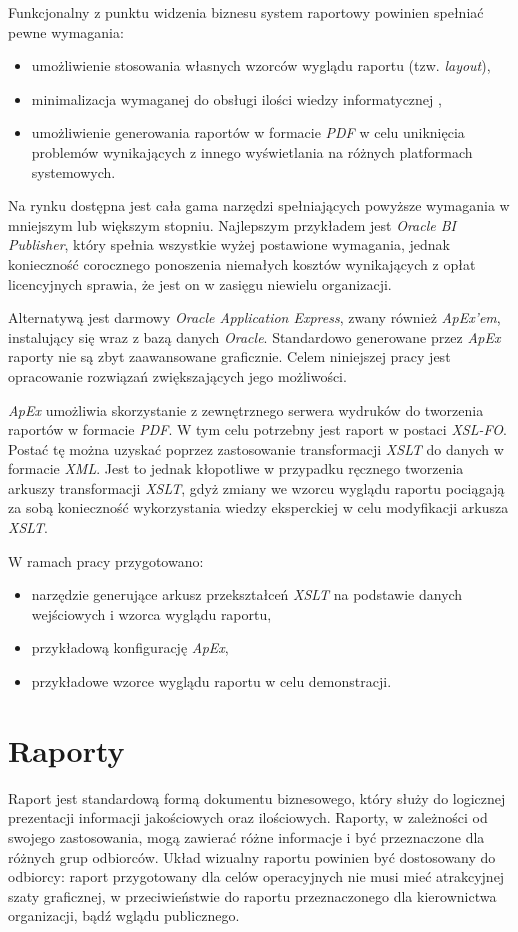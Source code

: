 \documentclass[11pt,a4paper]{article}
\begin{document}
Funkcjonalny z punktu widzenia biznesu system raportowy powinien spełniać pewne wymagania:
\begin{itemize}
	\item umożliwienie stosowania własnych wzorców wyglądu raportu (tzw. \emph{layout}),
	\item minimalizacja wymaganej do obsługi ilości wiedzy informatycznej ,
	\item umożliwienie generowania raportów w formacie \emph{PDF} w celu uniknięcia problemów wynikających z innego wyświetlania na różnych platformach systemowych.
\end{itemize}

Na rynku dostępna jest cała gama narzędzi spełniających powyższe wymagania w mniejszym lub większym stopniu. Najlepszym przykładem jest \emph{Oracle BI Publisher}, który spełnia wszystkie wyżej postawione wymagania, jednak konieczność corocznego ponoszenia niemałych kosztów wynikających z opłat licencyjnych sprawia, że jest on w zasięgu niewielu organizacji.

Alternatywą jest darmowy \emph{Oracle Application Express}, zwany również \emph{ApEx'em}, instalujący się wraz z bazą danych \emph{Oracle}. Standardowo generowane przez \emph{ApEx} raporty nie są zbyt zaawansowane graficznie. Celem niniejszej pracy jest opracowanie rozwiązań zwiększających jego możliwości.

\emph{ApEx} umożliwia skorzystanie z zewnętrznego serwera wydruków do tworzenia raportów w formacie \emph{PDF}. W tym celu potrzebny jest raport w postaci \emph{XSL-FO}. Postać tę można uzyskać poprzez zastosowanie transformacji \emph{XSLT} do danych w formacie \emph{XML}. Jest to jednak kłopotliwe w przypadku ręcznego tworzenia arkuszy transformacji \emph{XSLT}, gdyż zmiany we wzorcu wyglądu raportu pociągają za sobą konieczność wykorzystania wiedzy eksperckiej w celu modyfikacji arkusza \emph{XSLT}.

\bigskip
W ramach pracy przygotowano:
\begin{itemize}
	\item narzędzie generujące arkusz przekształceń \emph{XSLT} na podstawie danych wejściowych i wzorca wyglądu raportu,
	\item przykładową konfigurację \emph{ApEx},
	\item przykładowe wzorce wyglądu raportu w celu demonstracji.
\end{itemize}


\newpage

\section{Raporty} \label{sec:teoria}
Raport jest standardową formą dokumentu biznesowego, który służy do logicznej prezentacji informacji jakościowych oraz ilościowych.
 Raporty, w zależności od swojego zastosowania, mogą zawierać różne informacje i być przeznaczone dla różnych grup odbiorców. Układ wizualny raportu powinien być dostosowany do odbiorcy: raport przygotowany dla celów operacyjnych nie musi mieć atrakcyjnej szaty graficznej, w przeciwieństwie do raportu przeznaczonego dla kierownictwa organizacji, bądź wglądu publicznego. 
\end{document}

